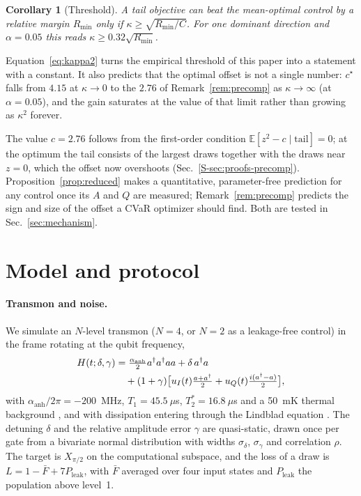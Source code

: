 \documentclass[aps,pra,twocolumn,superscriptaddress,reprint,nofootinbib,floatfix]{revtex4-2}
\newtheorem{corollary}{Corollary}
\theoremstyle{definition}
\newcommand{\E}{\mathbb{E}}
\newcommand{\sref}[1]{Sec.~\ref{S-#1}}
\begin{document}
\begin{corollary}[Threshold]
\label{cor:threshold}
A tail objective can beat the mean-optimal control by a relative margin
$R_{\min}$ only if $\kappa\ge\sqrt{R_{\min}/C}$. For one dominant direction
and $\alpha=0.05$ this reads $\kappa\ge0.32\sqrt{R_{\min}}$.
\end{corollary}

Equation~\eqref{eq:kappa2} turns the empirical threshold of this paper into a
statement with a constant. It also predicts that the optimal offset is not a
single number: $c^\star$ falls from $4.15$ at $\kappa\to0$ to the $2.76$ of
Remark~\ref{rem:precomp} as $\kappa\to\infty$ (at $\alpha=0.05$), and the gain
saturates at the value of that limit rather than growing as $\kappa^2$
forever.

The value $c=2.76$ follows from the first-order condition
$\E[z^2-c\mid\text{tail}]=0$; at the optimum the tail consists of the largest
draws together with the draws near $z=0$, which the offset now overshoots
(\sref{sec:proofs-precomp}). Proposition~\ref{prop:reduced} makes a
quantitative, parameter-free prediction for any control once its $A$ and $Q$
are measured; Remark~\ref{rem:precomp} predicts the sign and size of the
offset a CVaR optimizer should find. Both are tested in
Sec.~\ref{sec:mechanism}.

\section{Model and protocol}
\label{sec:model}

\paragraph*{Transmon and noise.} We simulate an $N$-level transmon ($N=4$,
or $N=2$ as a leakage-free control) in the frame rotating at the qubit
frequency,
\begin{align}
H(t;\delta,\gamma)&=\tfrac{\alpha_{\mathrm{anh}}}{2}a^\dagger a^\dagger aa+\delta\,a^\dagger a\notag\\
&\quad+(1+\gamma)\big[u_I(t)\tfrac{a+a^\dagger}{2}+u_Q(t)\tfrac{i(a^\dagger-a)}{2}\big],
\label{eq:H}
\end{align}
with $\alpha_{\mathrm{anh}}/2\pi=-200$~MHz, $T_1=45.5~\mu$s,
$T_2^*=16.8~\mu$s and a 50~mK thermal background \cite{Koch2007,Krantz2019},
and with dissipation entering through the Lindblad equation
\cite{Lindblad1976}. The detuning $\delta$ and the relative amplitude error
$\gamma$ are quasi-static, drawn once per gate from a bivariate normal
distribution with widths $\sigma_\delta$, $\sigma_\gamma$ and correlation
$\rho$. The target is $X_{\pi/2}$ on the computational subspace, and the loss
of a draw is $L=1-\bar F+7P_{\mathrm{leak}}$, with $\bar F$ averaged over four
input states and $P_{\mathrm{leak}}$ the population above level~1.
\end{document}
